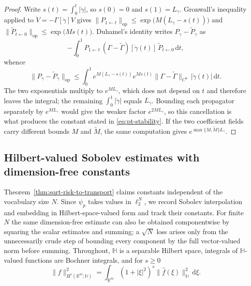 \documentclass[11pt]{article}
\theoremstyle{definition}
\theoremstyle{remark}
\newcommand{\R}{\mathbb{R}}
\newcommand{\op}{\mathrm{op}}
\newcommand{\dd}{\mathrm{d}}
\begin{document}
\begin{proof}
Write $s(t)=\int_0^t|\dot\gamma|$, so $s(0)=0$ and $s(1)=L_\gamma$. Gronwall's
inequality applied to $\dot V=-\Gamma[\dot\gamma]V$ gives
$\|P_{1\leftarrow t}\|_{\op}\le\exp\bigl(M(L_\gamma-s(t))\bigr)$ and
$\|\widetilde P_{t\leftarrow0}\|_{\op}\le\exp\bigl(Ms(t)\bigr)$. Duhamel's
identity writes $P_\gamma-\widetilde P_\gamma$ as
\begin{equation}
    -\int_0^1P_{1\leftarrow t}\,
      (\Gamma-\widetilde\Gamma)[\dot\gamma(t)]\,
      \widetilde P_{t\leftarrow0}\,\dd t,
\end{equation}
whence
\begin{equation}
    \|P_\gamma-\widetilde P_\gamma\|_{\op}
    \le\int_0^1
      e^{M(L_\gamma-s(t))}e^{Ms(t)}
      \|\Gamma-\widetilde\Gamma\|_{C^0}\,|\dot\gamma(t)|\,\dd t .
\end{equation}
The two exponentials multiply to $e^{ML_\gamma}$, which does not depend on $t$
and therefore leaves the integral; the remaining $\int_0^1|\dot\gamma|$ equals
$L_\gamma$. Bounding each propagator separately by $e^{ML_\gamma}$ would give
the weaker factor $e^{2ML_\gamma}$, so this cancellation is what produces the
constant stated in \eqref{eq:pt-stability}. If the two coefficient fields carry
different bounds $M$ and $\widetilde M$, the same computation gives
$e^{\max\{M,\widetilde M\}L_\gamma}$.
\end{proof}

\subsection{Hilbert-valued Sobolev estimates with dimension-free constants}

Theorem~\ref{thm:sqrt-risk-to-transport} claims constants independent of the
vocabulary size $N$. Since $\psi_p$ takes values in $\ell_2^N$, we record
Sobolev interpolation and embedding in Hilbert-space-valued form and track
their constants. For finite $N$ the same dimension-free estimate can also be
obtained componentwise by squaring the scalar estimates and summing; a
$\sqrt N$ loss arises only from the unnecessarily crude step of bounding every
component by the full vector-valued norm before summing. Throughout,
$\mathbb H$ is a separable Hilbert space,
integrals of $\mathbb H$-valued functions are Bochner integrals, and for $s\ge0$
\begin{equation}
    \|f\|_{H^s(\R^m;\mathbb H)}^2
    =\int_{\R^m}(1+|\xi|^2)^s\|\hat f(\xi)\|_{\mathbb H}^2\,\dd\xi .
\end{equation}
\end{document}
